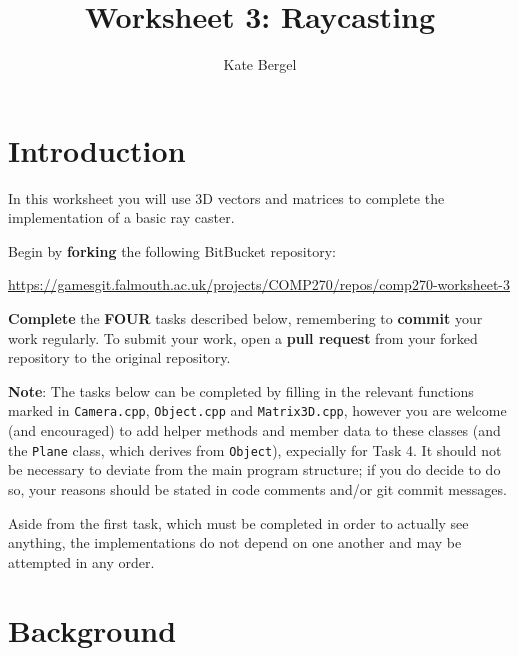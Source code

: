 \documentclass{../../../fal_assignment}
\title{Worksheet 3: Raycasting}
\author{Kate Bergel}
\begin{document}
\maketitle

\section*{Introduction}

In this worksheet you will use 3D vectors and matrices to complete the implementation of a basic ray caster.

Begin by \textbf{forking} the following BitBucket repository:

\begin{center}
	\url{https://gamesgit.falmouth.ac.uk/projects/COMP270/repos/comp270-worksheet-3}
\end{center}

\textbf{Complete} the \textbf{FOUR} tasks described below, remembering to \textbf{commit} your work regularly.
To submit your work, open a \textbf{pull request} from your forked repository to the original repository.

\textbf{Note}: The tasks below can be completed by filling in the relevant functions marked in \texttt{Camera.cpp}, \texttt{Object.cpp} and \texttt{Matrix3D.cpp}, however you are welcome (and encouraged) to add helper methods and member data to these classes (and the \texttt{Plane} class, which derives from \texttt{Object}), expecially for Task 4. It should not be necessary to deviate from the main program structure; if you do decide to do so, your reasons should be stated in code comments and/or git commit messages.

Aside from the first task, which must be completed in order to actually see anything, the implementations do not depend on one another and may be attempted in any order.

\section*{Background}
\end{document}
